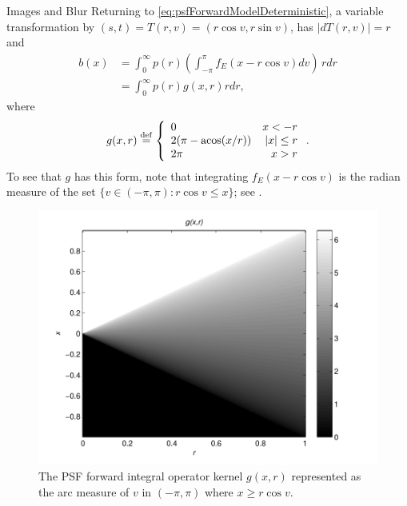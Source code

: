 \begin{chapter}{Images and Blur}
  Returning to \eqref{eq:psfForwardModelDeterministic}, a variable transformation
  by $(s,t) = T(r,v) = (r\cos v,r\sin v)$, has $|dT(r,v)| = r$ and 
  \begin{align}
    b(x) &= \int_0^\infty p(r) \left( \int_{-\pi}^\pi f_E(x - r\cos v)dv \right)\,r dr\nonumber \\
         &= \int_0^\infty p(r) g(x,r) r dr, \label{eq:radialForwardModelDeterministic}
  \end{align}
where
\begin{equation} \label{eq:radialForwardKernel}
  g(x,r) \stackrel{\rm def}{=} \left\{\begin{array}{lr}
    0 & x < - r\\
    2(\pi - \operatorname*{acos}(x/r)) & |x| \le r\\
    2\pi &  x> r
  \end{array}\right..  
\end{equation}
  To see that $g$ has this form, note that integrating $f_E(x-r\cos v)$ is the radian measure of the set $\{v\in(-\pi,\pi): r\cos v \le x\}$; see .  

\begin{figure}
  \begin{center}
  \includegraphics[width=.5\textwidth]{figures/g_function.pdf}
\end{center}
\caption{ The PSF forward integral operator kernel $g(x,r)$ represented as the arc measure of $v$ in $(-\pi,\pi)$ where $x \ge r\cos v$. }\label{fig:radialForwardKernel}
\end{figure}


\end{chapter}
